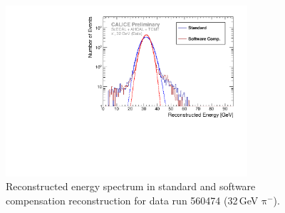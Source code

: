 \documentclass[twoside,a4paper,12pt]{article}
\newcommand\piminus{\(\mathrm{\pi^-}\)}
\begin{document}
\begin{appendix}
\begin{figure}[htbp]
\begin{center}
\includegraphics[width=0.8\textwidth]{fig/pion/SC/ERec_classic_SC_560474_data.pdf}
\caption{Reconstructed energy spectrum in standard and software compensation reconstruction for data run 560474 (32\,GeV \piminus).}
\label{fig:erec_pi_32gev}
\end{center}
\end{figure}

\end{appendix}
\end{document}
